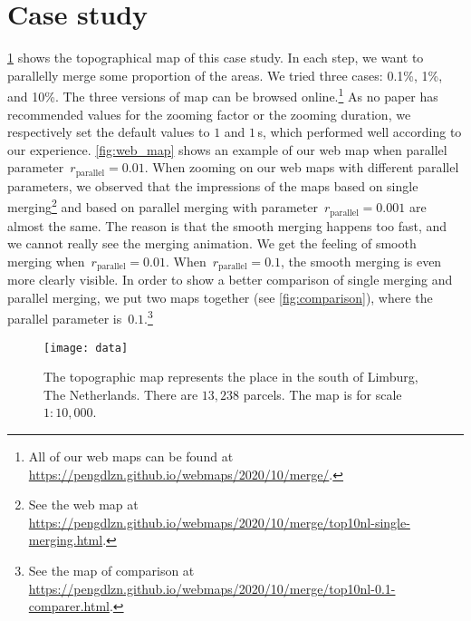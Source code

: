 \documentclass{ica}
\begin{document}
\section{Case study}
\label{sec:case_study}





%
\fig\ref{fig:data} shows the topographical map of this case study.
In each step, we want to parallelly merge some proportion of the areas.
We tried three cases: 0.1\%, 1\%, and 10\%.
The three versions of map can be browsed online.\footnote{%
All of our web maps can be found at
\url{https://pengdlzn.github.io/webmaps/2020/10/merge/}.}
As no paper has recommended values for 
the zooming factor or the zooming duration,
we respectively set the default values to $1$ and $1\,$s, 
which performed well according to our experience.
\fig\ref{fig:web_map} shows an example of our web map when 
parallel parameter~$r_\mathrm{parallel}=0.01$.
When zooming on our web maps with different parallel parameters,
we observed that the impressions of the maps 
based on single merging\footnote{%
See the web map at
\url{https://pengdlzn.github.io/webmaps/2020/10/merge/top10nl-single-merging.html}.} 
and based on parallel merging with parameter~$r_\mathrm{parallel}= 0.001$ 
are almost the same.
The reason is that the smooth merging happens too fast,
and we cannot really see the merging animation.
We get the feeling of smooth merging when~$r_\mathrm{parallel}= 0.01$.
When~$r_\mathrm{parallel}= 0.1$, 
the smooth merging is even more clearly visible.
In order to show a better comparison of single merging 
and parallel merging,
we put two maps together (see \fig\ref{fig:comparison}),
where the parallel parameter is~$0.1$.\footnote{%
See the map of comparison at
\url{https://pengdlzn.github.io/webmaps/2020/10/merge/top10nl-0.1-comparer.html}.}  




\begin{figure}[tb]
\centering
\texttt{[image: data]}
\caption{
    The topographic map represents the place 
    in the south of Limburg, The Netherlands.
    There are $13{,}238$ parcels.
    The map is for scale $1:10{,}000$.}
\label{fig:data}
\end{figure}
\end{document}

